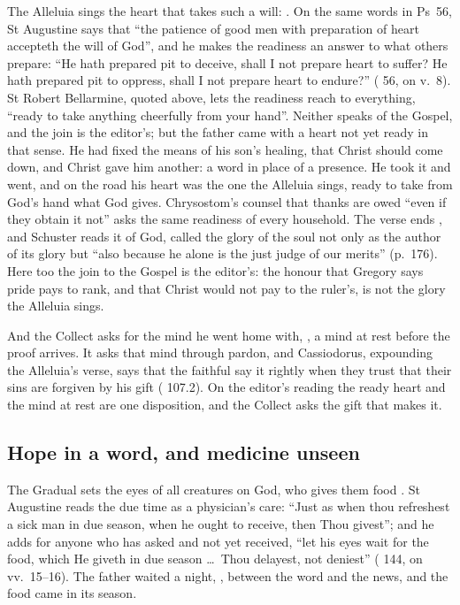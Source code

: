 The Alleluia sings the heart that takes such a will: . On the same words in Ps~56, St Augustine says that
``the patience of good men with preparation of heart accepteth the will of
God'', and he makes the readiness an answer to what others prepare: ``He hath
prepared pit to deceive, shall I not prepare heart to suffer? He hath prepared
pit to oppress, shall I not prepare heart to endure?'' ( 56, on v.~8). St Robert Bellarmine, quoted above, lets the readiness
reach to everything, ``ready to take anything cheerfully from your hand''. Neither
speaks of the Gospel, and the join is the editor's; but the father came with a
heart not yet ready in that sense. He had fixed the means of his son's healing,
that Christ should come down, and Christ gave him another: a word in place of a
presence. He took it and went, and on the road his heart was the one the
Alleluia sings, ready to take from God's hand what God gives. Chrysostom's
counsel that thanks are owed ``even if they obtain it not'' asks the same
readiness of every household. The verse ends , and Schuster
reads it of God, called the glory of the soul not only as the author of its
glory but ``also because he alone is the just judge of our merits'' (p.~176). Here too the join to the Gospel is the editor's: the honour
that Gregory says pride pays to rank, and that Christ would not pay to the
ruler's, is not the glory the Alleluia sings.

And the Collect asks for the mind he went home with, , a
mind at rest before the proof arrives. It asks that mind through pardon, and
Cassiodorus, expounding the Alleluia's verse, says that the faithful say it
rightly when they trust that their sins are forgiven by his gift
( 107.2). On the editor's reading the ready heart and
the mind at rest are one disposition, and the Collect asks the gift that makes
it.

\subsection{Hope in a word, and medicine unseen}

The Gradual sets the eyes of all creatures on God, who gives them food
. St Augustine reads the due time as a physician's
care: ``Just as when thou refreshest a sick man in due season, when he ought to
receive, then Thou givest''; and he adds for anyone who has asked and not yet
received, ``let his eyes wait for the food, which He giveth in due season \dots\
Thou delayest, not deniest'' ( 144, on vv.~15--16). The
father waited a night, \latin{heri hora septima}, between the word and the news,
and the food came in its season.

